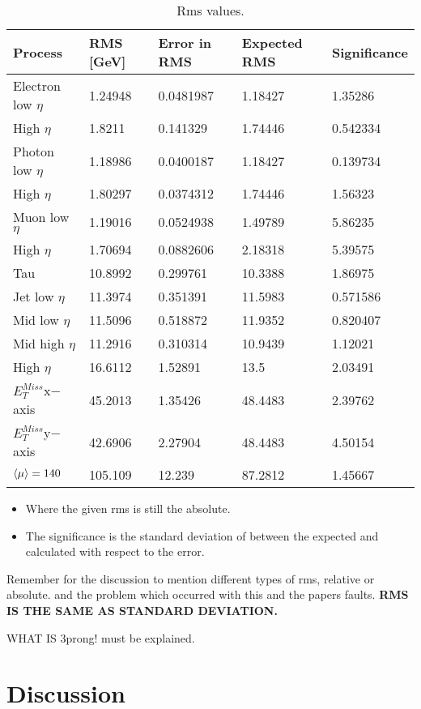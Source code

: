 \begin{table}[H]
\begin{center}
\begin{tabular}{|l|l|l|l|l|}
\hline
Process&RMS [GeV]&Error in RMS&Expected RMS& Significance\\ \hline
Electron low $\eta$&1.24948&0.0481987&1.18427&1.35286\\
High $\eta$&1.8211&0.141329&1.74446&0.542334\\ \hline
Photon low $\eta$&1.18986&0.0400187&1.18427&0.139734\\
High $\eta$&1.80297&0.0374312&1.74446&1.56323\\ \hline
Muon low $\eta$&1.19016&0.0524938&1.49789&5.86235\\
High $\eta$&1.70694&0.0882606&2.18318&5.39575\\ \hline
Tau&10.8992&0.299761&10.3388&1.86975\\ \hline
Jet low $\eta$&11.3974&0.351391&11.5983&0.571586\\
Mid low $\eta$&11.5096&0.518872&11.9352&0.820407\\
Mid high $\eta$&11.2916&0.310314&10.9439&1.12021\\
High $\eta$&16.6112&1.52891&13.5&2.03491\\ \hline
$E_T^{Miss} $x$-$axis&45.2013&1.35426&48.4483&2.39762\\ \hline
$E_T^{Miss} $y$-$axis&42.6906&2.27904&48.4483&4.50154\\ 
$\left<\mu\right>=140$&105.109&12.239&87.2812&1.45667\\  \hline
\end{tabular}
\end{center}
\caption{Rms values.}
\label{tab:rmsval}
\end{table}
\begin{itemize}
\item Where the given rms is still the absolute. 
\item The significance is the standard deviation of between the expected and calculated with respect to the error.
\end{itemize}
Remember for the discussion to mention different types of rms, relative or absolute. and the problem which occurred with this and the papers faults. \textbf{RMS IS THE SAME AS STANDARD DEVIATION.}

WHAT IS 3prong! must be explained.
\section{Discussion}
